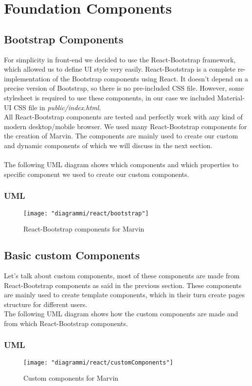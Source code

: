 \documentclass[../react]{subfiles}
\begin{document}
	
	\section{Foundation Components}

	\subsection{Bootstrap Components} For simplicity in front-end we decided to use the React-Bootstrap framework, which allowed us to define UI style very easily. React-Bootstrap is a complete re-implementation of the Bootstrap components using React. It doesn't depend on a precise version of Bootstrap, so there is no pre-included CSS file. However, some stylesheet is required to use these components, in our case we included Material-UI CSS file in \textit{public/index.html}. \\ All React-Bootstrap components are tested and perfectly work with any kind of modern desktop/mobile browser. We used many React-Bootstrap components for the creation of Marvin. The components are mainly used to create our custom and dynamic components 
	of which we will discuss in the next section. \\ \\ The following UML diagram shows which components and which properties to specific component we used to create our custom components. 
		\subsubsection{UML}
		\begin{figure}[h]
			\centering
			\texttt{[image: "diagrammi/react/bootstrap"]}
			\caption{React-Bootstrap components for Marvin}
			\label{fig:React-Bootstrap components for Marvin}
		\end{figure}
	\newpage
	\subsection{Basic custom Components} Let's talk about custom components, most of these components are made from React-Bootstrap components as said in the previous section. These components are mainly used to create template components, which in their turn create pages structure for different users. \\The following UML diagram shows how the custom components are made and from which React-Bootstrap components.  
	\\ 
		\subsubsection{UML}
			\begin{figure}[h]
			\centering
			\texttt{[image: "diagrammi/react/customComponents"]}
			\caption{Custom components for Marvin}
			\label{fig:Custom components for Marvin}
		\end{figure}
\end{document}
